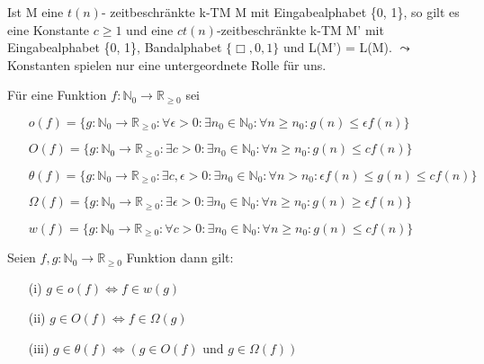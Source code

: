     Ist M eine \(t(n)\)- zeitbeschränkte k-TM M mit Eingabealphabet \{0, 1\}, so gilt es eine Konstante \(c \geq 1\) und eine \(ct(n)\)-zeitbeschränkte k-TM M' mit Eingabealphabet \{0, 1\}, Bandalphabet \(\{\Box, 0, 1\}\) und L(M') = L(M).
    \medskip
    \(\leadsto\) Konstanten spielen nur eine untergeordnete Rolle für uns.

    Für eine Funktion \(f: \mathbb{N}_0 \to \mathbb{R}_{\geq 0}\) sei
    \begin{itemize}
        \item [] \(o(f) = \{g: \mathbb{N}_0 \to \mathbb{R}_{\geq 0} : \forall \epsilon > 0 : \exists n_0 \in \mathbb{N}_0 : \forall n \geq n_0 : g(n) \leq \epsilon f(n)\}\)
        \item [] \(O(f) = \{g: \mathbb{N}_0 \to \mathbb{R}_{\geq 0} : \exists c > 0 : \exists n_0 \in \mathbb{N}_0 : \forall n \geq n_0 : g(n) \leq c f(n)\}\)
        \item [] \(\theta(f) = \{g: \mathbb{N}_0 \to \mathbb{R}_{\geq 0} : \exists c, \epsilon > 0 : \exists n_0 \in \mathbb{N}_0 : \forall n > n_0 : \epsilon f(n) \leq g(n) \leq cf(n)\}\)
        \item [] \(\Omega (f) = \{g: \mathbb{N}_0 \to \mathbb{R}_{\geq 0} : \exists \epsilon > 0 : \exists n_0 \in \mathbb{N}_0 : \forall n \geq n_0 : g(n) \geq \epsilon f(n)\}\)
        \item [] \(w(f) = \{g: \mathbb{N}_0 \to \mathbb{R}_{\geq 0} : \forall c > 0 : \exists n_0 \in \mathbb{N}_0 : \forall n \geq n_0 : g(n) \leq c f(n)\}\)
    \end{itemize}

    Seien \(f, g : \mathbb{N}_0 \to \mathbb{R}_{\geq 0}\) Funktion dann gilt:
    \begin{itemize}
        \item [(i)] \(g \in o(f) \Leftrightarrow f \in w(g)\)
        \item [(ii)] \(g \in O(f) \Leftrightarrow f \in \Omega(g)\)
        \item [(iii)] \(g \in \theta(f) \Leftrightarrow ( g \in O(f) \text{ und }g \in \Omega(f))\)
    \end{itemize}

